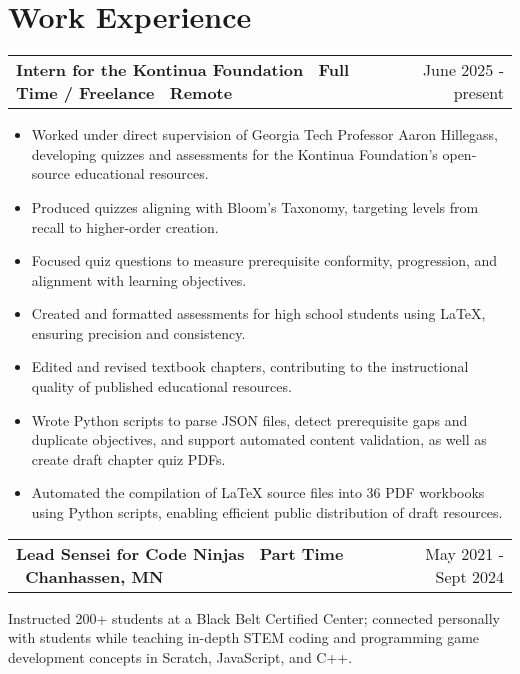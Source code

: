 \documentclass[a4paper,12pt]{article}
\makeatletter
\newenvironment{jobshort}[2]
    {
    \begin{tabularx}{\linewidth}{@{}l X r@{}}
    \textbf{#1} & \hfill &  #2 \\[3.75pt]
    \end{tabularx}
    }
    {
    }
\newenvironment{joblong}[2]
    {
    \begin{tabularx}{\linewidth}{@{}l X r@{}}
    \textbf{#1} & \hfill &  #2 \\[3.75pt]
    \end{tabularx}
    \begin{minipage}[t]{\linewidth}
    \begin{itemize}[nosep,after=\strut, leftmargin=1em, itemsep=3pt,label=--]
    }
    {
    \end{itemize}
    \end{minipage}    
    }
\makeatother
\begin{document}

\section{Work Experience}

\begin{joblong}{Intern for the Kontinua Foundation \textbullet\ Full Time / Freelance \textbullet\ Remote}{June 2025 - present}
\item Worked under direct supervision of Georgia Tech Professor Aaron Hillegass, developing quizzes and assessments for the Kontinua Foundation's open-source educational resources.
\item Produced quizzes aligning with Bloom's Taxonomy, targeting levels from recall to higher-order creation.
\item Focused quiz questions to measure prerequisite conformity, progression, and alignment with learning objectives.
\item Created and formatted assessments for high school students using LaTeX, ensuring precision and consistency.
\item Edited and revised textbook chapters, contributing to the instructional quality of published educational resources.
\item Wrote Python scripts to parse JSON files, detect prerequisite gaps and duplicate objectives, and support automated content validation, as well as create draft chapter quiz PDFs.
\item Automated the compilation of LaTeX source files into 36 PDF workbooks using Python scripts, enabling efficient public distribution of draft resources.
\end{joblong}


\begin{jobshort}{Lead Sensei for Code Ninjas \textbullet\ Part Time \textbullet\ Chanhassen, MN}{May 2021 - Sept 2024}
Instructed 200+ students at a Black Belt Certified Center; connected personally with students while teaching in-depth STEM coding and programming game development concepts in Scratch, JavaScript, and C++.
\end{jobshort}
\end{document}
